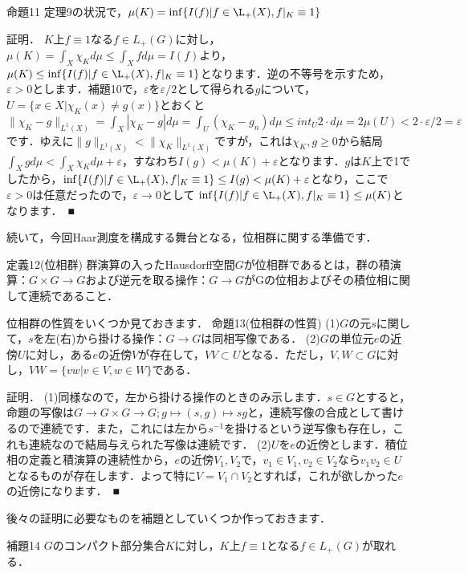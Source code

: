 命題11
定理9の状況で，$\mu(K)= \inf \{ I(f) | f \in \L_{+}(X), f|_{K} \equiv 1 \}$

証明．
$K$上$f \equiv 1$なる$f \in L_{+}(G)$に対し，$ \mu(K)=\int_{X}\chi_K d\mu \le \int_{X}f d\mu=I(f)$より，$\mu(K) \le \inf \{ I(f) | f \in \L_{+}(X), f|_{K} \equiv 1 \}$となります．逆の不等号を示すため，$\varepsilon>0$とします．補題10で，$\varepsilon$を$\varepsilon /2$として得られる$g$について，$U=\{ x \in X | \chi_{K}(x) \neq g(x) \}$とおくと$\| \chi_{K}-g\| _{L^1(X)} = \int_{X}|\chi_K-g|d\mu = \int_{U}(\chi_K-g_n)d\mu \le int_{U}2 \cdot d\mu=2\mu(U)<2 \cdot \varepsilon / 2=\varepsilon$です．ゆえに$\| g\| _{L^1(X)} < \| \chi_{K} \| _{L^1(X)} $ですが，これは$\chi_K, g \ge 0$から結局 $\int_{X}gd\mu < \int_{X}\chi_{K}d\mu +\varepsilon$，すなわち$I(g)<\mu (K)+\varepsilon$となります．$g$は$K$上で1でしたから，$\inf \{ I(f) | f \in \L_{+}(X), f|_{K} \equiv 1 \} \le I(g) <\mu (K)+\varepsilon$となり，ここで$\varepsilon>0$は任意だったので，$\varepsilon \to 0$として $\inf \{ I(f) | f \in \L_{+}(X), f|_{K} \equiv 1 \} \le \mu (K)$となります．　■


続いて，今回Haar測度を構成する舞台となる，位相群に関する準備です．

定義12(位相群)
群演算の入ったHausdorff空間$G$が位相群であるとは，群の積演算：$G \times G \to G$および逆元を取る操作：$G \to G$がGの位相およびその積位相に関して連続であること．

位相群の性質をいくつか見ておきます．
命題13(位相群の性質)
(1)$G$の元$s$に関して，$s$を左(右)から掛ける操作：$G \to G$は同相写像である．
(2)$G$の単位元$e$の近傍$U$に対し，ある$e$の近傍$V$が存在して，$VV \subset U$となる．ただし，$V,W \subset G$に対し，$VW= \{ vw | v \in V, w \in W \}$である．

証明．
(1)同様なので，左から掛ける操作のときのみ示します．$s \in G$とすると，命題の写像は$G \to G \times G \to G ; g \mapsto (s,g) \mapsto sg$と，連続写像の合成として書けるので連続です．また，これには左から$s^{-1}$を掛けるという逆写像も存在し，これも連続なので結局与えられた写像は連続です．
(2)$U$を$e$の近傍とします．積位相の定義と積演算の連続性から，$e$の近傍$V_1, V_2$で，$v_{1} \in V_1, v_{2} \in V_2$なら$v_{1}v_{2} \in U$となるものが存在します．よって特に$V=V_1 \cap V_2$とすれば，これが欲しかった$e$の近傍になります．　■

後々の証明に必要なものを補題としていくつか作っておきます．

補題14
$G$のコンパクト部分集合$K$に対し，$K$上$f \equiv 1$となる$f \in L_{+}(G)$が取れる．

